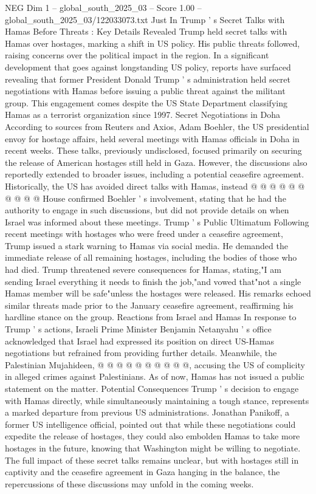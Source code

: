 \begin{textsample}{NEG Dim 1 – global\_south\_2025\_03 – Score 1.00 – global\_south\_2025\_03/122033073.txt}  \label{ex:f1_neg_181}
Just In Trump ' s Secret Talks with Hamas Before Threats : Key Details Revealed Trump held secret talks with Hamas over hostages, marking a shift in US policy.
His public threats followed, raising concerns over the political impact in the region.
In a significant development that goes against longstanding US policy, reports have surfaced revealing that former President Donald Trump ' s administration held secret negotiations with Hamas before issuing a public threat against the militant group.
This engagement comes despite the US State Department classifying Hamas as a terrorist organization since 1997.
Secret Negotiations in Doha According to sources from Reuters and Axios, Adam Boehler, the US presidential envoy for hostage affairs, held several meetings with Hamas officials in Doha in recent weeks.
These talks, previously undisclosed, focused primarily on securing the release of American hostages still held in Gaza.
However, the discussions also reportedly extended to broader issues, including a potential ceasefire agreement.
Historically, the US has avoided direct talks with Hamas, instead @ @ @ @ @ @ @ @ @ @ House confirmed Boehler ' s involvement, stating that he had the authority to engage in such discussions, but did not provide details on when Israel was informed about these meetings.
Trump ' s Public Ultimatum Following recent meetings with hostages who were freed under a ceasefire agreement, Trump issued a stark warning to Hamas via social media.
He demanded the immediate release of all remaining hostages, including the bodies of those who had died.
Trump threatened severe consequences for Hamas, stating,"I am sending Israel everything it needs to finish the job,"and vowed that"not a single Hamas member will be safe"unless the hostages were released.
His remarks echoed similar threats made prior to the January ceasefire agreement, reaffirming his hardline stance on the group.
Reactions from Israel and Hamas In response to Trump ' s actions, Israeli Prime Minister Benjamin Netanyahu ' s office acknowledged that Israel had expressed its position on direct US-Hamas negotiations but refrained from providing further details.
Meanwhile, the Palestinian Mujahideen, @ @ @ @ @ @ @ @ @ @, accusing the US of complicity in alleged crimes against Palestinians.
As of now, Hamas has not issued a public statement on the matter.
Potential Consequences Trump ' s decision to engage with Hamas directly, while simultaneously maintaining a tough stance, represents a marked departure from previous US administrations.
Jonathan Panikoff, a former US intelligence official, pointed out that while these negotiations could expedite the release of hostages, they could also embolden Hamas to take more hostages in the future, knowing that Washington might be willing to negotiate.
The full impact of these secret talks remains unclear, but with hostages still in captivity and the ceasefire agreement in Gaza hanging in the balance, the repercussions of these discussions may unfold in the coming weeks.

\end{textsample}
